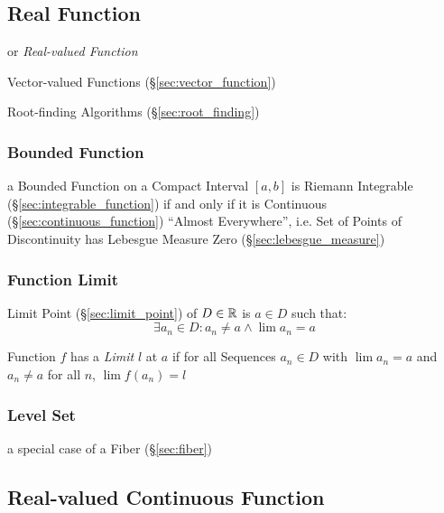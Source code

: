 \subsection{Real Function}\label{sec:real_function}

or \emph{Real-valued Function}

\fist Vector-valued Functions (\S\ref{sec:vector_function})

\fist Root-finding Algorithms (\S\ref{sec:root_finding})



\subsubsection{Bounded Function}\label{sec:bounded_function}

a Bounded Function on a Compact Interval $[a,b]$ is Riemann Integrable
(\S\ref{sec:integrable_function}) if and only if it is Continuous
(\S\ref{sec:continuous_function}) ``Almost Everywhere'', i.e. Set of Points of
Discontinuity has Lebesgue Measure Zero (\S\ref{sec:lebesgue_measure})



\subsubsection{Function Limit}\label{sec:function_limit}

Limit Point (\S\ref{sec:limit_point}) of $D \in \mathbb{R}$ is $a \in D$
such that:
\[
  \exists a_n \in D : a_n \neq a \wedge \lim a_n = a
\]

Function $f$ has a \emph{Limit} $l$ at $a$ if for all Sequences $a_n
\in D$ with $\lim a_n = a$ and $a_n \neq a$ for all $n$, $\lim f(a_n)
= l$



\subsubsection{Level Set}\label{sec:level_set}

a special case of a Fiber (\S\ref{sec:fiber})



\subsection{Real-valued Continuous Function}\label{sec:real_continuous}

